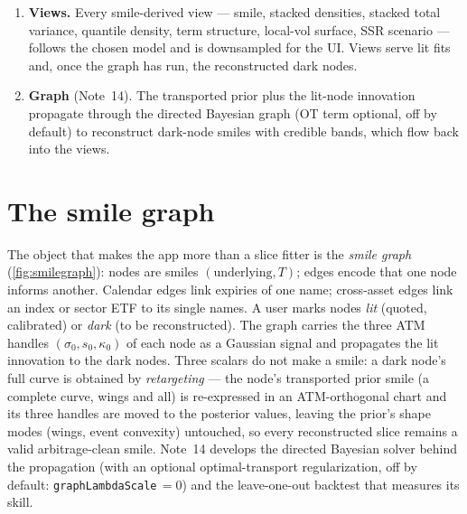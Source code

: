 \documentclass[11pt]{article}
\begin{document}
\begin{enumerate}[leftmargin=1.6em]
mid / bid--ask band / haircut (Note~07), optional var-swap target (Note~08),
calendar coupling (Note~10), event clock (Note~11), and Bayesian prior
persistence (Note~13). The observation Kalman filter (Note~15) sequences by
mode: \texttt{off} adds nothing (byte-identical); \texttt{overlay} updates the
filtered state and display \emph{after} the fit commits; \texttt{active}
inserts the prediction prior into the calibration objective \emph{before}
optimization.
\item \textbf{Views.} Every smile-derived view --- smile, stacked densities,
stacked total variance, quantile density, term structure, local-vol surface,
SSR scenario --- follows the chosen model and is downsampled for the UI. Views
serve lit fits and, once the graph has run, the reconstructed dark nodes.
\item \textbf{Graph} (Note~14). The transported prior plus the lit-node
innovation propagate through the directed Bayesian graph (OT term optional,
off by default) to reconstruct dark-node smiles with credible bands, which
flow back into the views.
\end{enumerate}

\section{The smile graph}
\label{sec:graph}

The object that makes the app more than a slice fitter is the \emph{smile graph}
(\cref{fig:smilegraph}): nodes are smiles $(\text{underlying},T)$; edges encode
that one node informs another. Calendar edges link expiries of one name;
cross-asset edges link an index or sector ETF to its single names. A user marks
nodes \emph{lit} (quoted, calibrated) or \emph{dark} (to be reconstructed). The
graph carries the three ATM handles $(\sigma_0,s_0,\kappa_0)$ of each node as a
Gaussian signal and propagates the lit innovation to the dark nodes. Three
scalars do not make a smile: a dark node's full curve is obtained by
\emph{retargeting} --- the node's transported prior smile (a complete curve,
wings and all) is re-expressed in an ATM-orthogonal chart and its three handles
are moved to the posterior values, leaving the prior's shape modes (wings,
event convexity) untouched, so every reconstructed slice remains a valid
arbitrage-clean smile. Note~14 develops the directed Bayesian solver behind
the propagation (with an optional optimal-transport regularization, off by
default: \texttt{graphLambdaScale}$\,=0$) and the leave-one-out backtest that
measures its skill.
\end{document}
